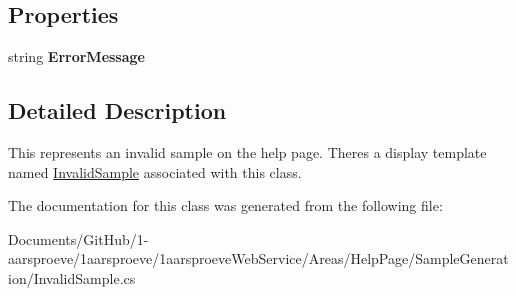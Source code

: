 \subsection*{Properties}
\begin{DoxyCompactItemize}
\item 
\hypertarget{class__1aarsproeve_web_service_1_1_areas_1_1_help_page_1_1_invalid_sample_aa93907902bb52616392de80e5d603f0b}{}string {\bfseries Error\+Message}\label{class__1aarsproeve_web_service_1_1_areas_1_1_help_page_1_1_invalid_sample_aa93907902bb52616392de80e5d603f0b}

\end{DoxyCompactItemize}


\subsection{Detailed Description}
This represents an invalid sample on the help page. There\textquotesingle{}s a display template named \hyperlink{class__1aarsproeve_web_service_1_1_areas_1_1_help_page_1_1_invalid_sample}{Invalid\+Sample} associated with this class. 



The documentation for this class was generated from the following file\+:\begin{DoxyCompactItemize}
\item 
Documents/\+Git\+Hub/1-\/aarsproeve/1aarsproeve/1aarsproeve\+Web\+Service/\+Areas/\+Help\+Page/\+Sample\+Generation/Invalid\+Sample.\+cs\end{DoxyCompactItemize}

